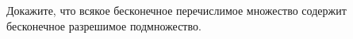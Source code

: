 Докажите, что всякое бесконечное перечислимое множество содержит бесконечное разрешимое подмножество.
